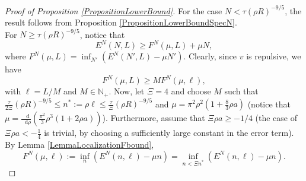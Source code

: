 \documentclass[a4paper,11pt]{article}
\newcommand*\diff{\mathop{}\!\mathrm{d}}
\numberwithin{equation}{section}
\begin{document}
		\begin{proof}[Proof of Proposition \ref{PropositionLowerBound}]
			For the case $ N<\tau (\rho R)^{-9/5} $, the result follows from Proposition \ref{PropositionLowerBoundSpecN}.\\
			For $ N\geq \tau (\rho R)^{-9/5} $, notice that \begin{equation}
			E^N(N,L)\geq F^N(\mu,L)+\mu N,
			\end{equation}
			where $ F^N(\mu,L)=\inf_{N'}\left(E^N(N',L)-\mu N'\right) $. Clearly, since $v$ is repulsive, we have \begin{equation}
			F^N(\mu,L)\geq M F^N(\mu,\ell)\label{EqLocalizationF},
			\end{equation}
			with $ \ell=L/M $ and $ M\in \mathbb{N}_+ $. 
			Now, let $\Xi= 4 $ and choose $ M $ such that $ \frac{\tau}{2\Xi}\left(\rho R\right)^{-9/5}\leq n^*:=\rho\ell\leq \frac{\tau}{\Xi}\left(\rho R\right)^{-9/5} $ and $ \mu=\pi^2\rho^2\left(1+\frac{8}{3}\rho a\right) $ (notice that $ \mu=\frac{\diff}{\diff \rho}(\frac{\pi^2}{3}\rho^3(1+2\rho a))$). Furthermore, assume that $\Xi\rho a\geq -1/4$ (the case of $ \Xi\rho a<-\frac{1}{4} $ is trivial, by choosing a sufficiently large constant in the error term). By Lemma \ref{LemmaLocalizationFbound},  \begin{equation}
			F^N(\mu,\ell):=\inf_{n}\left(E^N(n,\ell)-\mu n\right)=\inf_{n<\Xi n^*}\left(E^N(n,\ell)-\mu n\right).
			\end{equation}

\end{proof}
\end{document}
